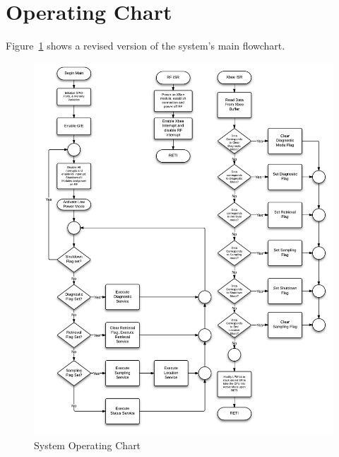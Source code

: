 \section{Operating Chart}

Figure~\ref{fig:systemFlowchart} shows a revised version of the system's main flowchart.

\begin{figure}[H]
	\centering
	\includegraphics[width=\textwidth]{img/SystemFlowchart}
	\caption{System Operating Chart \label{fig:systemFlowchart}}
\end{figure}